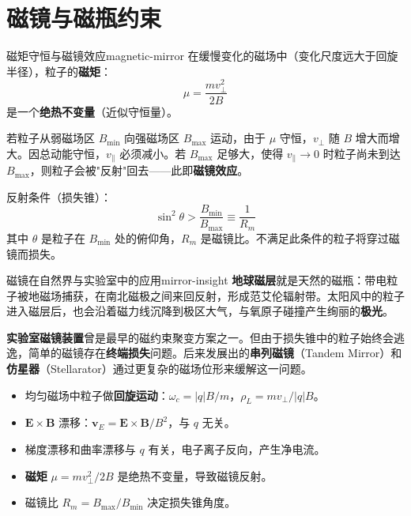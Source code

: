 \documentclass[12pt,a4paper,openany,oneside]{book}
\newcommand{\vect}[1]{\bm{#1}}
\newcommand{\difficulty}[1]{\marginnote{\hfill\textcolor{coverMid!80}{\rule[-0.1em]{2pt}{0.9em}}\,\textcolor{coverMid}{\footnotesize\textbf{[#1]}}}}
\begin{document}
\section{磁镜与磁瓶约束}\difficulty{提高}

\begin{theorem}{磁矩守恒与磁镜效应}{magnetic-mirror}
在缓慢变化的磁场中（变化尺度远大于回旋半径），粒子的\textbf{磁矩}：
\[
\mu = \frac{m v_\perp^2}{2B}
\]
是一个\textbf{绝热不变量}（近似守恒量）。

若粒子从弱磁场区 $B_{\min}$ 向强磁场区 $B_{\max}$ 运动，由于 $\mu$ 守恒，$v_\perp$ 随 $B$ 增大而增大。因总动能守恒，$v_\parallel$ 必须减小。若 $B_{\max}$ 足够大，使得 $v_\parallel \to 0$ 时粒子尚未到达 $B_{\max}$，则粒子会被"反射"回去——此即\textbf{磁镜效应}。

反射条件（损失锥）：
\[
\sin^2\theta > \frac{B_{\min}}{B_{\max}} \equiv \frac{1}{R_m}
\]
其中 $\theta$ 是粒子在 $B_{\min}$ 处的俯仰角，$R_m$ 是磁镜比。不满足此条件的粒子将穿过磁镜而损失。
\end{theorem}

\begin{insight}{磁镜在自然界与实验室中的应用}{mirror-insight}
\textbf{地球磁层}就是天然的磁瓶：带电粒子被地磁场捕获，在南北磁极之间来回反射，形成范艾伦辐射带。太阳风中的粒子进入磁层后，也会沿着磁力线沉降到极区大气，与氧原子碰撞产生绚丽的\textbf{极光}。

\textbf{实验室磁镜装置}曾是最早的磁约束聚变方案之一。但由于损失锥中的粒子始终会逃逸，简单的磁镜存在\textbf{终端损失}问题。后来发展出的\textbf{串列磁镜}（Tandem Mirror）和\textbf{仿星器}（Stellarator）通过更复杂的磁场位形来缓解这一问题。
\end{insight}

\begin{chapterreview}
\begin{itemize}
\item 均匀磁场中粒子做\textbf{回旋运动}：$\omega_c = |q|B/m$，$\rho_L = mv_\perp/|q|B$。
\item $\vect{E}\times\vect{B}$ 漂移：$\vect{v}_E = \vect{E}\times\vect{B}/B^2$，与 $q$ 无关。
\item 梯度漂移和曲率漂移与 $q$ 有关，电子离子反向，产生净电流。
\item \textbf{磁矩} $\mu = mv_\perp^2/2B$ 是绝热不变量，导致磁镜反射。
\item 磁镜比 $R_m = B_{\max}/B_{\min}$ 决定损失锥角度。
\end{itemize}
\end{chapterreview}
\end{document}
